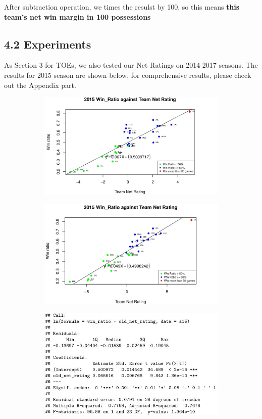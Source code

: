 \documentclass[11pt]{article}
\begin{document}
After subtraction operation, we times the resulst by 100, so this means \textbf{this team's net win margin in 100 possessions}

\subsection*{4.2 Experiments}
As Section 3 for TOEs, we also tested our Net Ratings on 2014-2017 seasons.
The results for 2015 season are shown below, for comprehensive results, please check out the Appendix part.

\begin{figure}[h!]
  \centering
  \begin{subfigure}[b]{0.45\linewidth}
    \includegraphics[width=\linewidth]{old_nr.jpg}
  \end{subfigure}
  \begin{subfigure}[b]{0.45\linewidth}
    \includegraphics[width=\linewidth]{new_nr.jpg}
  \end{subfigure}
  \begin{subfigure}[b]{0.42\linewidth}
    \includegraphics[width=\linewidth]{old_nr_summary.jpg}

\end{subfigure}
\end{figure}
\end{document}
